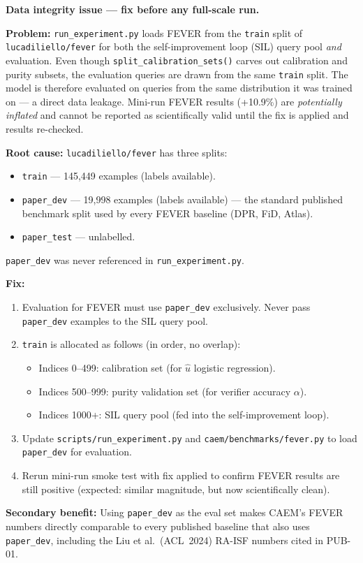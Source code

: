 \documentclass[12pt,a4paper]{article}
\newcommand{\uhat}{\hat{u}}
\begin{document}
\begin{mdframed}[style=fixbox]
\textbf{\textcolor{fixred}{Data integrity issue --- fix before any full-scale run.}}

\textbf{Problem:} \texttt{run\_experiment.py} loads FEVER from the \texttt{train} split
of \texttt{lucadiliello/fever} for both the self-improvement loop (SIL) query pool
\emph{and} evaluation.
Even though \texttt{split\_calibration\_sets()} carves out calibration and purity
subsets, the evaluation queries are drawn from the same \texttt{train} split.
The model is therefore evaluated on queries from the same distribution it was
trained on --- a direct data leakage.
Mini-run FEVER results (+10.9\%) are \emph{potentially inflated} and cannot be
reported as scientifically valid until the fix is applied and results re-checked.

\textbf{Root cause:} \texttt{lucadiliello/fever} has three splits:
\begin{itemize}[noitemsep]
  \item \texttt{train} --- 145,449 examples (labels available).
  \item \texttt{paper\_dev} --- 19,998 examples (labels available) --- the standard
        published benchmark split used by every FEVER baseline (DPR, FiD, Atlas).
  \item \texttt{paper\_test} --- unlabelled.
\end{itemize}
\texttt{paper\_dev} was never referenced in \texttt{run\_experiment.py}.

\textbf{Fix:}
\begin{enumerate}[noitemsep]
  \item Evaluation for FEVER must use \texttt{paper\_dev} exclusively.
        Never pass \texttt{paper\_dev} examples to the SIL query pool.
  \item \texttt{train} is allocated as follows (in order, no overlap):
    \begin{itemize}[noitemsep]
      \item Indices 0--499: calibration set (for $\uhat$ logistic regression).
      \item Indices 500--999: purity validation set (for verifier accuracy $\alpha$).
      \item Indices 1000+: SIL query pool (fed into the self-improvement loop).
    \end{itemize}
  \item Update \texttt{scripts/run\_experiment.py} and
        \texttt{caem/benchmarks/fever.py} to load \texttt{paper\_dev} for evaluation.
  \item Rerun mini-run smoke test with fix applied to confirm FEVER results are
        still positive (expected: similar magnitude, but now scientifically clean).
\end{enumerate}

\textbf{Secondary benefit:} Using \texttt{paper\_dev} as the eval set makes
CAEM's FEVER numbers directly comparable to every published baseline
that also uses \texttt{paper\_dev}, including the Liu et al.\ (ACL~2024)
RA-ISF numbers cited in PUB-01.
\end{mdframed}
\end{document}
